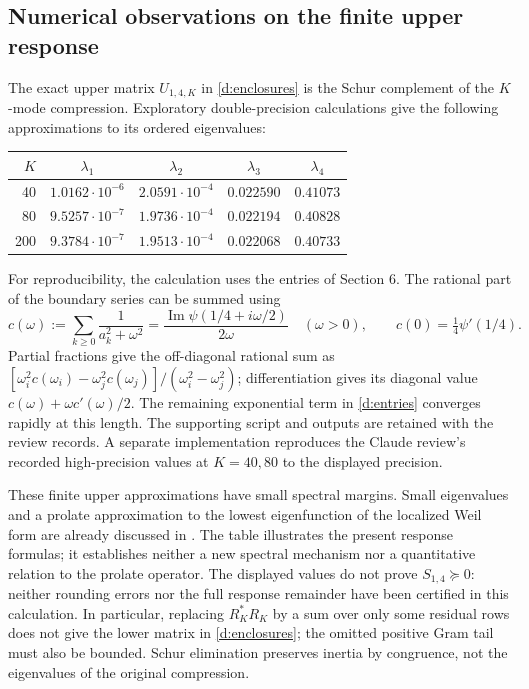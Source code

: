 \subsection{Numerical observations on the finite upper response}
The exact upper matrix $U_{1,4,K}$ in \eqref{d:enclosures} is the Schur
complement of the $K$-mode compression. Exploratory double-precision
calculations give the following approximations to its ordered eigenvalues:
\begin{center}
\begin{tabular}{rcccc}
\toprule
$K$ & $\lambda_1$ & $\lambda_2$ & $\lambda_3$ & $\lambda_4$\\\midrule
40  & $1.0162\cdot10^{-6}$ & $2.0591\cdot10^{-4}$ & $0.022590$ & $0.41073$\\
80  & $9.5257\cdot10^{-7}$ & $1.9736\cdot10^{-4}$ & $0.022194$ & $0.40828$\\
200 & $9.3784\cdot10^{-7}$ & $1.9513\cdot10^{-4}$ & $0.022068$ & $0.40733$\\
\bottomrule
\end{tabular}
\end{center}
For reproducibility, the calculation uses the entries of Section 6.
The rational part of the boundary series can be summed using
\[
c(\omega):=\sum_{k\ge0}\frac1{a_k^2+\omega^2}
=\frac{\operatorname{Im}\psi(1/4+i\omega/2)}{2\omega}
\quad(\omega>0),\qquad c(0)=\tfrac14\psi'(1/4).
\]
Partial fractions give the off-diagonal rational sum as
$[\omega_i^2c(\omega_i)-\omega_j^2c(\omega_j)]/
(\omega_i^2-\omega_j^2)$; differentiation gives its diagonal value
$c(\omega)+\omega c'(\omega)/2$. The remaining exponential term in
\eqref{d:entries} converges rapidly at this length. The supporting script
and outputs are retained with the review records. A separate
implementation reproduces the Claude review's recorded high-precision
values at $K=40,80$ to the displayed precision.

These finite upper approximations have small spectral margins.
Small eigenvalues and a prolate approximation to the lowest eigenfunction
of the localized Weil form are already discussed in \cite[Sections 7--8]{CCM}.
The table illustrates the present response formulas; it establishes neither
a new spectral mechanism nor a quantitative relation to the prolate operator.
The displayed values do not prove $S_{1,4}\succeq0$: neither rounding errors nor the full
response remainder have been certified in this calculation.
In particular, replacing $R_K^*R_K$ by a sum over only some residual rows
does not give the lower matrix in \eqref{d:enclosures}; the omitted
positive Gram tail must also be bounded. Schur elimination preserves
inertia by congruence, not the eigenvalues of the original compression.

